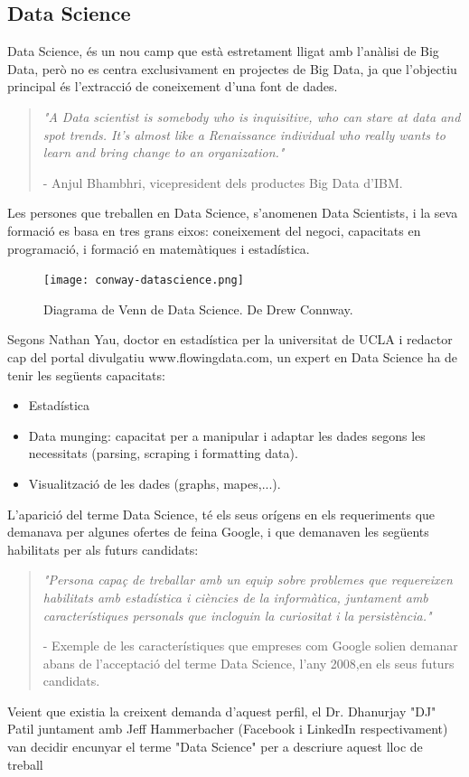 \documentclass[12pt,a4paper,openright,oneside]{article}
\numberwithin{equation}{section}
\theoremstyle{definition}
\begin{document}
\subsection{Data Science}
Data Science, és un nou camp que està estretament lligat amb l'anàlisi de Big Data, però no es centra exclusivament en projectes de Big Data, ja que l'objectiu principal és l'extracció de coneixement d'una font de dades.

\begin{quote}
\emph{"A Data scientist is somebody who is inquisitive, who can stare at data and spot trends. It's almost like a Renaissance individual who really wants to learn and bring change to an organization."}
\begin{flushright}
- Anjul Bhambhri, vicepresident dels productes Big Data d'IBM.
\end{flushright}
\end{quote}

Les persones que treballen en Data Science, s'anomenen Data Scientists, i la seva formació es basa en tres grans eixos: coneixement del negoci, capacitats en programació, i formació en matemàtiques i estadística.

\begin{figure}[htbp]
\centering
\texttt{[image: conway-datascience.png]}
\caption{Diagrama de Venn de Data Science. De Drew Connway.\cite{datascienceVenn}}
\end{figure}
\newpage
Segons Nathan Yau, doctor en estadística per la universitat de UCLA i redactor cap del portal divulgatiu www.flowingdata.com, un expert en Data Science ha de tenir les següents capacitats:
\begin{itemize}
\item Estadística
\item Data munging: capacitat per a manipular i adaptar les dades segons les necessitats (parsing, scraping i formatting data).
\item Visualització de les dades (graphs, mapes,...).
\end{itemize}
L'aparició del terme Data Science, té els seus orígens en els requeriments que demanava per algunes ofertes de feina Google, i que demanaven les següents habilitats per als futurs candidats:
\begin{quote}
\emph{"Persona capaç de treballar amb un equip sobre problemes que requereixen habilitats amb estadística i ciències de la informàtica, juntament amb característiques personals que incloguin la curiositat i la persistència."}
\begin{flushright}
- Exemple de les característiques que empreses com Google solien demanar abans de l'acceptació del terme Data Science, l'any 2008,en els seus futurs candidats.\cite{datasciencejob}
\end{flushright}
\end{quote}
Veient que existia la creixent demanda d'aquest perfil, el Dr. Dhanurjay "DJ" Patil juntament amb Jeff Hammerbacher (Facebook i LinkedIn respectivament) van decidir encunyar el terme "Data Science" per a descriure aquest lloc de treball\cite{datasciencejob} 
\newpage
\end{document}
